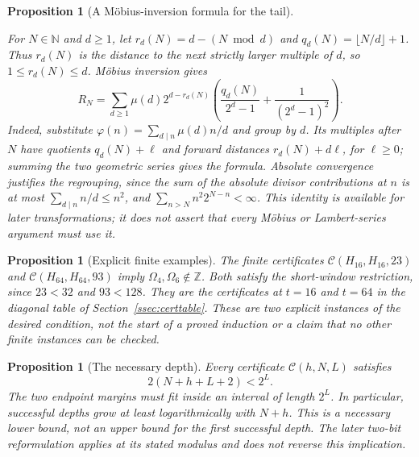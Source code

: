\documentclass[11pt]{article}
\theoremstyle{plain}
\newtheorem{prop}[thm]{Proposition}
\theoremstyle{definition}
\theoremstyle{remark}
\begin{document}
\begin{prop}[A M\"obius-inversion formula for the tail]\label{prop:MP-01-inv}

For $N\in\mathbb N$ and $d\ge1$, let
$r_d(N)=d-(N\bmod d)$ and $q_d(N)=\lfloor N/d\rfloor+1$.
Thus $r_d(N)$ is the distance to the next strictly larger multiple of
$d$, so $1\le r_d(N)\le d$. M\"obius inversion gives
\[
 R_N=\sum_{d\ge1}\mu(d)2^{d-r_d(N)}
 \left(\frac{q_d(N)}{2^d-1}+\frac{1}{(2^d-1)^2}\right).
\]
Indeed, substitute $\varphi(n)=\sum_{d\mid n}\mu(d)n/d$ and group
by $d$. Its multiples after $N$ have quotients $q_d(N)+\ell$ and
forward distances $r_d(N)+d\ell$, for $\ell\ge0$; summing the two
geometric series gives the formula. Absolute convergence justifies the
regrouping, since the sum of the absolute divisor contributions at $n$
is at most $\sum_{d\mid n}n/d\le n^2$, and
$\sum_{n>N}n^2 2^{N-n}<\infty$.
This identity is available for later transformations; it does not
assert that every M\"obius or Lambert-series argument must use it.

\end{prop}

\begin{prop}[Explicit finite examples]\label{prop:SK-01-inv}
The finite certificates
$\mathcal C(H_{16},H_{16},23)$ and
$\mathcal C(H_{64},H_{64},93)$ imply
$\Omega_4,\Omega_6\notin\mathbb Z$. Both satisfy the short-window
restriction, since $23<32$ and $93<128$. They are the certificates at
$t=16$ and $t=64$ in the diagonal table of Section~\ref{ssec:certtable}.
These are two explicit instances of the desired condition, not the
start of a proved induction or a claim that no other finite instances
can be checked.

\end{prop}

\begin{prop}[The necessary depth]\label{prop:A5-inv}
Every certificate $\mathcal C(h,N,L)$ satisfies
\[
 2(N+h+L+2)<2^L.
\]
The two endpoint margins must fit inside an interval of length $2^L$.
In particular, successful depths grow at least logarithmically with
$N+h$. This is a necessary lower bound, not an upper bound for the
first successful depth. The later two-bit reformulation applies at its
stated modulus and does not reverse this implication.

\end{prop}
\end{document}
